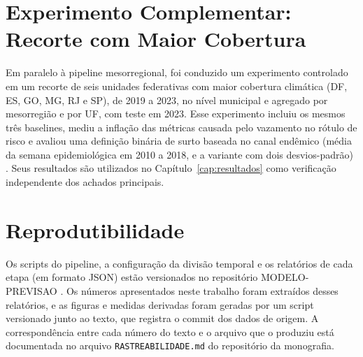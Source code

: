 \section{Experimento Complementar: Recorte com Maior Cobertura}
\label{sec:met_complementar}

Em paralelo à pipeline mesorregional, foi conduzido um experimento controlado em um recorte de seis unidades federativas com maior cobertura climática (DF, ES, GO, MG, RJ e SP), de 2019 a 2023, no nível municipal e agregado por mesorregião e por UF, com teste em 2023. Esse experimento incluiu os mesmos três baselines, mediu a inflação das métricas causada pelo vazamento no rótulo de risco e avaliou uma definição binária de surto baseada no canal endêmico (média da semana epidemiológica em 2010 a 2018, e a variante com dois desvios-padrão) \cite{bortman1999canal}. Seus resultados são utilizados no Capítulo~\ref{cap:resultados} como verificação independente dos achados principais.

\section{Reprodutibilidade}

Os scripts do pipeline, a configuração da divisão temporal e os relatórios de cada etapa (em formato JSON) estão versionados no repositório MODELO-PREVISAO \cite{modeloprevisao2026}. Os números apresentados neste trabalho foram extraídos desses relatórios, e as figuras e medidas derivadas foram geradas por um script versionado junto ao texto, que registra o commit dos dados de origem. A correspondência entre cada número do texto e o arquivo que o produziu está documentada no arquivo \texttt{RASTREABILIDADE.md} do repositório da monografia.
